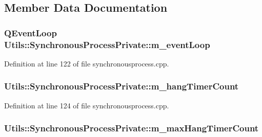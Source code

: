 \subsection{Member Data Documentation}
\hypertarget{struct_utils_1_1_synchronous_process_private_a6180310bc850d467e6de05bb290cbe4d}{
\subsubsection[{m\-\_\-event\-Loop}]{\setlength{\rightskip}{0pt plus 5cm}Q\-Event\-Loop Utils\-::\-Synchronous\-Process\-Private\-::m\-\_\-event\-Loop}}\label{struct_utils_1_1_synchronous_process_private_a6180310bc850d467e6de05bb290cbe4d}


Definition at line 122 of file synchronousprocess.\-cpp.

\hypertarget{struct_utils_1_1_synchronous_process_private_ac7de20b273159cc80d6e65fc726667a9}{
\subsubsection[{m\-\_\-hang\-Timer\-Count}]{ Utils\-::\-Synchronous\-Process\-Private\-::m\-\_\-hang\-Timer\-Count}}\label{struct_utils_1_1_synchronous_process_private_ac7de20b273159cc80d6e65fc726667a9}


Definition at line 124 of file synchronousprocess.\-cpp.

\hypertarget{struct_utils_1_1_synchronous_process_private_a597b1e5e3588256a60e31e098839f985}{
\subsubsection[{m\-\_\-max\-Hang\-Timer\-Count}]{ Utils\-::\-Synchronous\-Process\-Private\-::m\-\_\-max\-Hang\-Timer\-Count}}\label{struct_utils_1_1_synchronous_process_private_a597b1e5e3588256a60e31e098839f985}


